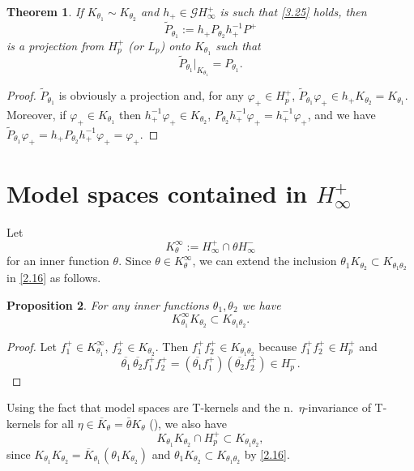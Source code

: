 \documentclass[11pt]{article}
\renewcommand\phi{\varphi}
\newtheorem{thm}{Theorem}[section]
\newtheorem{prop}[thm]{Proposition}
\numberwithin{equation}{section}
\def\beginpf{\begin{proof}}
\def\endpf{\end{proof}}
\def\beq{\begin{equation}}
\def\eeq{\end{equation}}
\begin{document}
\begin{thm} If $K_{\theta_1}\sim K_{\theta_2}$ and $h_+ \in \mathcal{G}H_\infty^+$ is such that \eqref{3.25} holds, then
\begin{equation}\label{3.27}
\widetilde{P}_{\theta_1}:= h_+P_{\theta_2}h_+^{-1}P^+
\end{equation}
is a projection from $H_p^+$ (or $L_p$) onto $K_{\theta_1}$ such that
\begin{equation}\label{3.28}
\widetilde{P}_{\theta_1}|_{K_{\theta_1}}=P_{\theta_1}.
\end{equation}
\end{thm}

\beginpf $\widetilde{P}_{\theta_1}$ is obviously a projection and, for any $\phi_+ \in H_p^+$, $\widetilde{P}_{\theta_1}\phi_+ \in h_+K_{\theta_2}=K_{\theta_1}$.
Moreover, if $\phi_+ \in K_{\theta_1}$ then $h_+^{-1}\phi_+ \in K_{\theta_2}$, $P_{\theta_2}h_+^{-1}\phi_+=h_+^{-1}\phi_+$, and we have
$\widetilde{P}_{\theta_1}\phi_+=h_+P_{\theta_2}h_+^{-1}\phi_+=\phi_+.$
\endpf





\section{Model spaces contained in $H_\infty^+$}
\label{sec:4}

 Let
\beq \label{2.23}
 K_{\theta}^\infty:=H^+_\infty \cap \theta H^-_\infty
\eeq
for an inner function $\theta$. 
Since $\theta \in K_{\theta}^\infty$, we can extend the  inclusion $\theta_1 K_{\theta_2} \subset K_{\theta_1\theta_2}$ in \eqref{2.16} as follows.

\begin{prop}
For any inner functions $\theta_1, \theta_2$ we have
\beq\label{eq:eq9}
K_{\theta_1}^\infty K_{\theta_2} \subset K_{\theta_1 \theta_2}.
\eeq
\end{prop}
\beginpf
Let $f_1^+ \in K_{\theta_1}^\infty$, $f_2^+ \in K_{\theta_2}$. Then $f_1^+f_2^+ \in K_{\theta_1 \theta_2} $ because $f_1^+f_2^+ \in H_{p}^+ $ and
\[\overline{\theta_1}\,\overline{\theta_2}f_1^+f_2^+=(\overline{\theta_1}f_1^+)(\overline{\theta_2}f_2^+) \in H_p^-.\]
\endpf

Using the fact that model spaces are T-kernels and the n.\ $\eta$-invariance of T-kernels for all $\eta \in \overline{K}_\theta= \bar{\theta} K_\theta$ (\cite{CP14}), we also have
\begin{equation}\label{4.3}
K_{\theta_1}K_{\theta_2} \cap H_p^+ \subset K_{\theta_1\theta_2},
\end{equation}
since $K_{\theta_1}K_{\theta_2}=\overline{K}_{\theta_1}(\theta_1K_{\theta_2})$ and $\theta_1K_{\theta_2}\subset K_{\theta_1\theta_2}$ by \eqref{2.16}.
\end{document}
